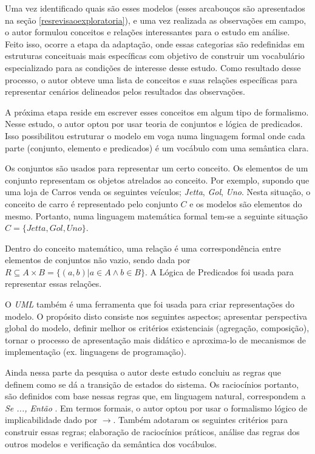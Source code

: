 Uma vez identificado quais são esses modelos (esses arcabouços são apresentados na seção \ref{resrevisaoexploratoria}), e uma vez realizada as observações em campo, o autor formulou conceitos e relações interessantes para o estudo em análise. Feito isso, ocorre a etapa da adaptação, onde essas categorias são redefinidas em estruturas conceituais mais específicas com objetivo de construir um vocabulário especializado para as condições de interesse desse estudo. Como resultado desse processo, o autor obteve uma lista de conceitos e suas relações específicas para representar cenários delineados pelos resultados das observações. 

A próxima etapa reside em escrever esses conceitos em algum tipo de formalismo. Nesse estudo, o autor optou por usar teoria de conjuntos e lógica de predicados. Isso possibilitou estruturar o modelo em voga numa linguagem formal onde cada parte (conjunto, elemento e predicados) é um vocábulo com uma semântica clara. 

Os conjuntos são usados para representar um certo conceito. Os elementos de um conjunto representam os objetos atrelados ao conceito. Por exemplo, supondo que uma loja de Carros venda os seguintes veículos; \textit{Jetta}, \textit{Gol}, \textit{Uno}.
Nesta situação, o conceito de carro é representado pelo conjunto $C$ e os modelos são elementos do mesmo. Portanto, numa linguagem matemática formal tem-se a seguinte situação $C = \{Jetta,Gol,Uno\}$. 

Dentro do conceito matemático, uma relação é uma correspondência entre elementos de conjuntos não vazio, sendo dada por $R \subseteq  A \times B = \{(a,b)| a \in A \wedge b \in B \}$. A Lógica de Predicados foi usada para representar essas
relações.

O \textit{UML} também é uma ferramenta que foi usada para criar representações do modelo. O propósito disto consiste nos seguintes aspectos; apresentar perspectiva global do modelo, definir melhor os critérios existenciais (agregação, composição),
tornar o processo de apresentação mais didático e aproxima-lo de mecanismos de implementação (ex. linguagens de programação). 

Ainda nessa parte da pesquisa o autor deste estudo concluiu as regras que definem como se dá a transição de estados do sistema. Os raciocínios portanto, são definidos com base nessas regras que, em linguagem natural, correspondem a \textit{Se ..., Então }. Em termos formais, o autor optou por usar o formalismo lógico de implicabilidade dado por $\to$. Também adotaram os seguintes critérios para construir essas regras; elaboração de raciocínios práticos, análise das regras dos outros modelos e verificação da semântica dos vocábulos.